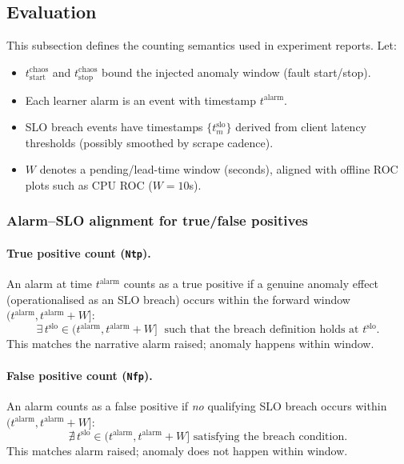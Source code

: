 \documentclass[sigconf]{acmart}
\begin{document}
\subsection{Evaluation}
\label{subsec:evaluation}

This subsection defines the counting semantics used in experiment reports. Let:
\begin{itemize}
  \item $t^{\mathrm{chaos}}_{\mathrm{start}}$ and $t^{\mathrm{chaos}}_{\mathrm{stop}}$ bound the injected anomaly window (fault start/stop).
  \item Each learner alarm is an event with timestamp $t^{\mathrm{alarm}}$.
  \item SLO breach events have timestamps $\{t^{\mathrm{slo}}_m\}$ derived from client latency thresholds (possibly smoothed by scrape cadence).
  \item $W$ denotes a pending/lead-time window (seconds), aligned with offline ROC plots such as CPU ROC ($W{=}10$s).
\end{itemize}

\subsubsection*{Alarm--SLO alignment for true/false positives}

\paragraph{True positive count (\texttt{Ntp}).}
An alarm at time $t^{\mathrm{alarm}}$ counts as a true positive if a genuine anomaly effect (operationalised as an SLO breach) occurs within the forward window $(t^{\mathrm{alarm}}, t^{\mathrm{alarm}}+W]$:
\begin{equation}
  \exists\, t^{\mathrm{slo}} \in (t^{\mathrm{alarm}}, t^{\mathrm{alarm}}+W] \;\text{ such that the breach definition holds at } t^{\mathrm{slo}}.
\end{equation}
This matches the narrative alarm raised; anomaly happens within window.

\paragraph{False positive count (\texttt{Nfp}).}
An alarm counts as a false positive if \emph{no} qualifying SLO breach occurs within $(t^{\mathrm{alarm}}, t^{\mathrm{alarm}}+W]$:
\begin{equation}
  \nexists\, t^{\mathrm{slo}} \in (t^{\mathrm{alarm}}, t^{\mathrm{alarm}}+W] \text{ satisfying the breach condition.}
\end{equation}
This matches alarm raised; anomaly does not happen within window.
\end{document}
